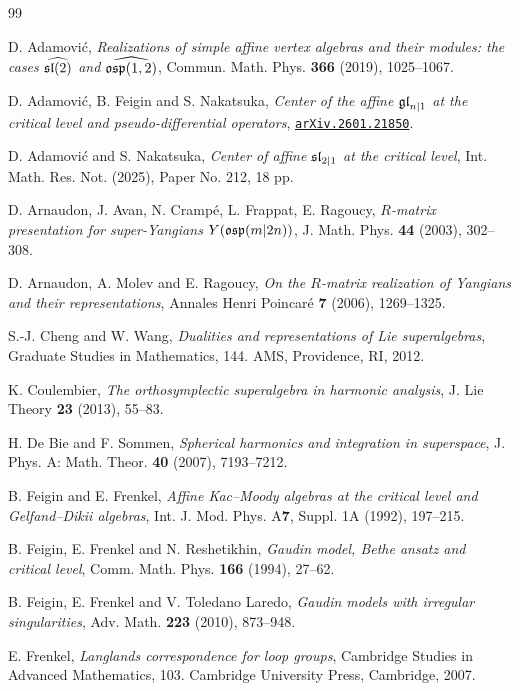 \documentclass[12pt]{article}
\begin{document}
\begin{thebibliography}{99}

D. Adamovi\'{c},
{\it Realizations of simple affine vertex algebras and their
modules: the cases $\widehat{\mathfrak{sl}(2)}$ and $\widehat{\mathfrak{osp}(1,2)}$},
Commun. Math. Phys. {\bf 366} (2019), 1025--1067.

D. Adamovi\'{c}, B. Feigin and S. Nakatsuka,
{\it Center of the affine $\mathfrak{gl}_{n|1}$ at the critical level and pseudo-differential operators},
\href{https://doi.org/10.48550/arXiv.2601.21850}{{\tt arXiv.2601.21850}}.

D. Adamovi\'{c} and S. Nakatsuka,
{\it Center of affine $\mathfrak{sl}_{2|1}$ at the critical level},
Int. Math. Res. Not. (2025), Paper No. 212, 18 pp.

{D. Arnaudon, J. Avan, N. Cramp\'e, L. Frappat, E. Ragoucy},
{\it $R$-matrix presentation for super-Yangians $Y({\mathfrak{osp}}(m\vert 2n))$},
{J. Math. Phys.}  {\bf 44}  (2003), 302--308.

{D. Arnaudon, A. Molev and E. Ragoucy},
{\it On the $R$-matrix realization of Yangians
and their representations},
Annales Henri Poincar\'e {\bf 7} (2006), 1269--1325.

S.-J. Cheng and W. Wang,
{\it Dualities and representations of Lie superalgebras},
Graduate Studies in Mathematics, 144. AMS, Providence, RI, 2012.

K. Coulembier,
{\it The orthosymplectic superalgebra in harmonic analysis},
J. Lie Theory {\bf 23} (2013), 55--83.

H. De Bie and F. Sommen,
{\it Spherical harmonics and integration in superspace},
J. Phys. A: Math. Theor. {\bf 40} (2007), 7193--7212.

B. Feigin and E. Frenkel,
{\it Affine Kac--Moody algebras at the critical level
and Gelfand--Dikii algebras},
Int. J. Mod. Phys. A{\bf 7}, Suppl. 1A (1992), 197--215.

B. Feigin, E. Frenkel and N. Reshetikhin,
{\it Gaudin model, Bethe ansatz and critical level},
Comm. Math. Phys. {\bf 166} (1994),
27--62.

B. Feigin, E. Frenkel and V. Toledano Laredo,
{\it Gaudin models with
irregular singularities},
Adv. Math. {\bf 223} (2010), 873--948.

E. Frenkel,
{\it Langlands correspondence for loop groups}, Cambridge
Studies in Advanced Mathematics,
103. Cambridge University Press, Cambridge, 2007.


\end{thebibliography}
\end{document}
